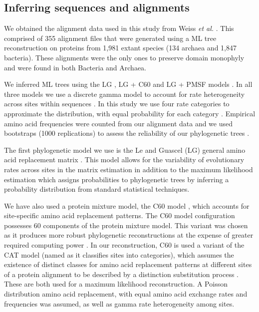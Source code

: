 \subsection{Inferring sequences and alignments}

We obtained the alignment data used in this study from Weiss \textit{et al.} \cite{weiss2016}. This comprised of 355 alignment files that were generated using a ML tree reconstruction on proteins from 1,981 extant species (134 archaea and 1,847 bacteria). These alignments were the only ones to preserve domain monophyly and were found in both Bacteria and Archaea. 

We inferred ML trees using the LG \cite{le2008improved}, LG + C60 \cite{si2008empirical} and LG + PMSF models \cite{wang2017modeling}. In all three models we use a discrete gamma model to account for rate heterogeneity across sites within sequences \cite{yang1994maximum}. In this study we use four rate categories to approximate the distribution, with equal probability for each category \cite{yang1994maximum}. Empirical amino acid frequencies were counted from our alignment data and we used bootstraps (1000 replications) to assess the reliability of our phylogenetic trees  \cite{soltis2003applying}.

The first phylogenetic model we use is the Le and Guascel (LG) general amino acid replacement matrix \cite{le2008improved}. This model allows for the variability of evolutionary rates across sites in the matrix estimation in addition to the maximum likelihood estimation which assigns probabilities to phylogenetic trees by inferring a probability distribution from standard statistical techniques. 


We have also used a protein mixture model, the C60 model \cite{si2008empirical}, which accounts for site-specific amino acid replacement patterns. The C60 model configuration possesses 60 components of the protein mixture model. This variant was chosen as it produces more robust phylogenetic reconstructions at the expense of greater required computing power \cite{si2008empirical}. In our reconstruction, C60 is used a variant of the CAT model (named as it classifies sites into categories), which assumes the existence of distinct classes for amino acid replacement patterns at different sites of a protein alignment to be described by a distinction substitution process \cite{lartillot2004bayesian}. These are both used for a maximum likelihood reconstruction. A Poisson distribution amino acid replacement, with equal amino acid exchange rates and frequencies was assumed, as well as gamma rate heterogeneity among sites.

